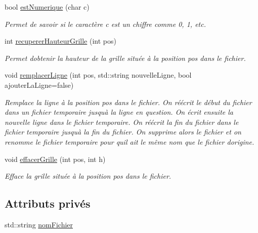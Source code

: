 \begin{DoxyCompactItemize}
bool \hyperlink{class_gestion_sauvegarde_a2394d23cf82fe561a2bf49ccb84f3a49}{est\+Numerique} (char c)
\begin{DoxyCompactList}\small\item\em Permet de savoir si le caractère {\ttfamily c} est un chiffre comme \textquotesingle{}0\textquotesingle{}, \textquotesingle{}1\textquotesingle{}, etc. \end{DoxyCompactList}\item 
int \hyperlink{class_gestion_sauvegarde_adbab128f25a22a4d759182ac3255584c}{recuperer\+Hauteur\+Grille} (int pos)
\begin{DoxyCompactList}\small\item\em Permet d\textquotesingle{}obtenir la hauteur de la grille située à la position {\ttfamily pos} dans le fichier. \end{DoxyCompactList}\item 
void \hyperlink{class_gestion_sauvegarde_a450f3a31228afa2b6a7d7aef54ce30b5}{remplacer\+Ligne} (int pos, std\+::string nouvelle\+Ligne, bool ajouter\+La\+Ligne=false)
\begin{DoxyCompactList}\small\item\em Remplace la ligne à la position {\ttfamily pos} dans le fichier. On réécrit le début du fichier dans un fichier temporaire jusqu\textquotesingle{}à la ligne en question. On écrit ensuite la nouvelle ligne dans le fichier temporaire. On réécrit la fin du fichier dans le fichier temporaire jusqu\textquotesingle{}à la fin du fichier. On supprime alors le fichier et on renomme le fichier temporaire pour qu\textquotesingle{}il ait le même nom que le fichier d\textquotesingle{}origine. \end{DoxyCompactList}\item 
void \hyperlink{class_gestion_sauvegarde_a961a4b996ef36a8601d972dbf6928d93}{effacer\+Grille} (int pos, int h)
\begin{DoxyCompactList}\small\item\em Efface la grille située à la position {\ttfamily pos} dans le fichier. \end{DoxyCompactList}\end{DoxyCompactItemize}
\subsection*{Attributs privés}
\begin{DoxyCompactItemize}
\item 
std\+::string \hyperlink{class_gestion_sauvegarde_afda944907acb4f5660cda5a893a8fb66}{nom\+Fichier}
\end{DoxyCompactItemize}


